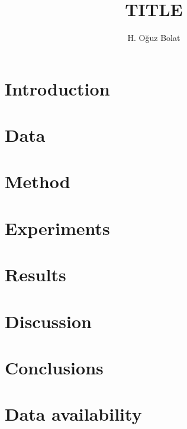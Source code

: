 \documentclass[preprint,12pt,authoryear]{elsarticle}
\begin{document}
\begin{frontmatter}

\title{TITLE}

\author[ytu]{H. O\u{g}uz Bolat}

\begin{abstract}
\end{abstract}

\begin{keyword}
\end{keyword}

\end{frontmatter}

\section{Introduction}

\section{Data}

\section{Method}

\section{Experiments}

\section{Results}

\section{Discussion}

\section{Conclusions}

\section*{Data availability}



\end{document}
